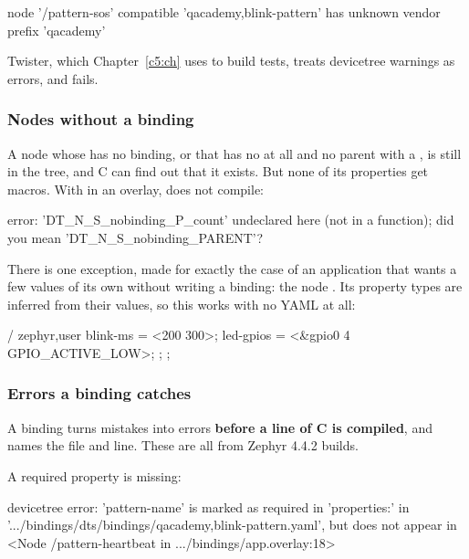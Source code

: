\begin{console}
node '/pattern-sos' compatible 'qacademy,blink-pattern' has unknown vendor prefix 'qacademy'
\end{console}

\noindent Twister, which Chapter~\ref{c5:ch} uses to build tests, treats devicetree warnings as
errors, and fails.

\subsubsection{Nodes without a binding}
A node whose  has no binding, or that has no  at all and no parent
with a , is still in the tree, and C can find out that it exists. But none of
its properties get macros. With  in an overlay,
 does not compile:

\begin{console}
error: 'DT_N_S_nobinding_P_count' undeclared here (not in a function); did you mean 'DT_N_S_nobinding_PARENT'?
\end{console}

\noindent There is one exception, made for exactly the case of an application that wants a few
values of its own without writing a binding: the node \textbf{}. Its property
types are inferred from their values, so this works with no YAML at all:

\begin{dtscode}
/ {
	zephyr,user {
		blink-ms = <200 300>;
		led-gpios = <&gpio0 4 GPIO_ACTIVE_LOW>;
	};
};
\end{dtscode}

\subsubsection{Errors a binding catches}
A binding turns mistakes into errors \textbf{before a line of C is compiled}, and names the file and
line. These are all from Zephyr 4.4.2 builds.

A required property is missing:

\begin{console}
devicetree error: 'pattern-name' is marked as required in 'properties:' in '.../bindings/dts/bindings/qacademy,blink-pattern.yaml', but does not appear in <Node /pattern-heartbeat in .../bindings/app.overlay:18>
\end{console}

